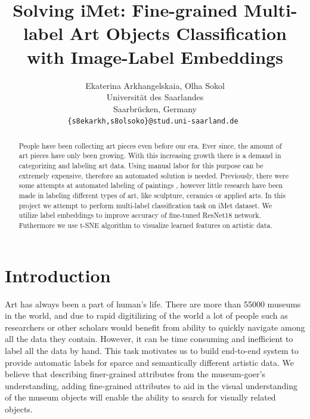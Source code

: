 \documentclass[10pt,twocolumn,letterpaper]{article}
\begin{document}
\title{Solving iMet: Fine-grained Multi-label Art Objects Classification with Image-Label Embeddings}

\author{Ekaterina Arkhangelskaia, Olha Sokol\\
Universit{\"a}t des Saarlandes\\
Saarbr{\"u}cken, Germany\\
{\tt\small \{s8ekarkh,s8olsoko\}@stud.uni-saarland.de }
}

\maketitle

\begin{abstract}
   People have been collecting art pieces even before our era. Ever since, the amount of art pieces have only been growing. With this increasing growth there is a demand in categorizing and labeling art data. Using manual labor for this purpose can be extremely expensive, therefore an automated solution is needed. Previously, there were some attempts at automated labeling of paintings \cite{Rijks}, however little research have been made in labeling different types of art, like sculpture, ceramics or applied arts. 
   In this project we attempt to perform multi-label classification task on iMet dataset. We utilize label embeddings to improve accuracy of fine-tuned ResNet18 network. Futhermore we use t-SNE algorithm to visualize learned features on artistic data. 

\end{abstract}

\section{Introduction}
Art has always been a part of human's life. There are more than 55000 museums in the world, and due to rapid digitilizing of the world a lot of people such as researchers or other scholars would benefit from ability to quickly  navigate among all the data they contain. However, it can be time consuming and inefficient to label all the data by hand. This task motivates us to build end-to-end system to provide automatic labels for sparce and semantically different artistic data. We believe that describing finer-grained attributes from the museum-goer’s understanding, adding fine-grained attributes to aid in the visual understanding of the museum objects will enable the ability to search for visually related objects.
\end{document}
